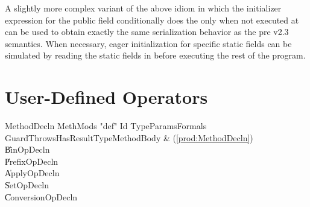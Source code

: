 A slightly more complex variant of the above idiom in which the
initializer expression for the public field conditionally does the 
only when not executed at  can be used to
obtain exactly the same serialization behavior as the pre \Xten{} v2.3
semantics.  When necessary, eager initialization for specific static fields
can be simulated by reading the static fields in  before
executing the rest of the program.

\section{User-Defined Operators}
\label{sect:operators}

\begin{bbgrammar}
         MethodDecln \: MethMods \xcd"def" Id TypeParams\opt Formals Guard\opt Throws\opt HasResultType\opt MethodBody & (\ref{prod:MethodDecln}) \\
                     \| BinOpDecln \\
                     \| PrefixOpDecln \\
                     \| ApplyOpDecln \\
                     \| SetOpDecln \\
                     \| ConversionOpDecln \\
\end{bbgrammar}


